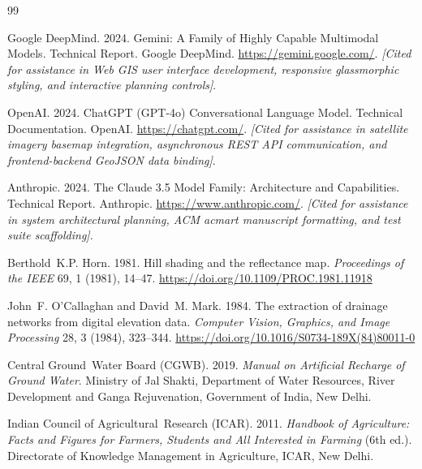 \documentclass[manuscript,screen,review]{acmart}
\begin{document}
\begin{thebibliography}{99}

Google DeepMind. 2024.
\newblock Gemini: A Family of Highly Capable Multimodal Models.
\newblock Technical Report. Google DeepMind. \url{https://gemini.google.com/}.
\newblock \textit{[Cited for assistance in Web GIS user interface development, responsive glassmorphic styling, and interactive planning controls]}.

OpenAI. 2024.
\newblock ChatGPT (GPT-4o) Conversational Language Model.
\newblock Technical Documentation. OpenAI. \url{https://chatgpt.com/}.
\newblock \textit{[Cited for assistance in satellite imagery basemap integration, asynchronous REST API communication, and frontend-backend GeoJSON data binding]}.

Anthropic. 2024.
\newblock The Claude 3.5 Model Family: Architecture and Capabilities.
\newblock Technical Report. Anthropic. \url{https://www.anthropic.com/}.
\newblock \textit{[Cited for assistance in system architectural planning, ACM acmart manuscript formatting, and test suite scaffolding]}.

Berthold~K.P. Horn. 1981.
\newblock Hill shading and the reflectance map.
\newblock \emph{Proceedings of the IEEE} 69, 1 (1981), 14--47.
\newblock \url{https://doi.org/10.1109/PROC.1981.11918}

John~F. O'Callaghan and David~M. Mark. 1984.
\newblock The extraction of drainage networks from digital elevation data.
\newblock \emph{Computer Vision, Graphics, and Image Processing} 28, 3 (1984), 323--344.
\newblock \url{https://doi.org/10.1016/S0734-189X(84)80011-0}

Central Ground~Water Board (CGWB). 2019.
\newblock \emph{Manual on Artificial Recharge of Ground Water}.
\newblock Ministry of Jal Shakti, Department of Water Resources, River Development and Ganga Rejuvenation, Government of India, New Delhi.

Indian Council of Agricultural~Research (ICAR). 2011.
\newblock \emph{Handbook of Agriculture: Facts and Figures for Farmers, Students and All Interested in Farming} (6th ed.).
\newblock Directorate of Knowledge Management in Agriculture, ICAR, New Delhi.

\end{thebibliography}
\end{document}
